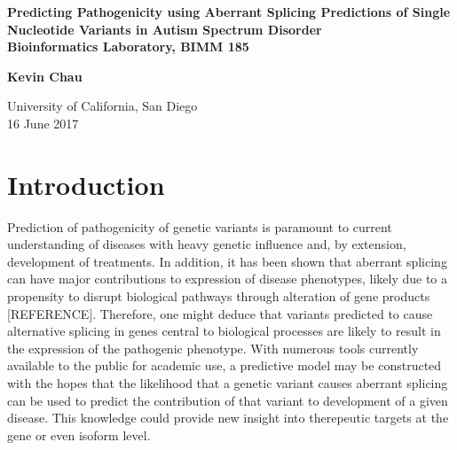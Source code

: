 \documentclass[12pt]{article}
\begin{document}
\lstset{style=output}
\setlength\parindent{0pt}

\begin{titlepage}
    \begin{center}
        \vspace*{1cm}

        \Huge
        \textbf{Predicting Pathogenicity using Aberrant Splicing Predictions of Single Nucleotide Variants in Autism Spectrum Disorder}\\


        \vspace{0.5cm}
        \Large
        \textbf{Bioinformatics Laboratory, BIMM 185}

        \vspace{1.5cm}
        \textbf{Kevin Chau}

        \vfill

        \Large
        University of California, San Diego\\
        16 June 2017
    \end{center}
\end{titlepage}


\pagebreak

\section{Introduction}
Prediction of pathogenicity of genetic variants is paramount to current 
understanding of diseases with heavy genetic influence and, by extension,
development of treatments. In addition, it has been shown that aberrant 
splicing can have major contributions to expression of disease phenotypes, 
likely due to a propensity to disrupt biological pathways through alteration 
of gene products [REFERENCE]. Therefore, one might deduce that variants 
predicted to cause alternative splicing in genes central to biological 
processes are likely to result in the expression of the pathogenic phenotype. 
With numerous tools currently available to the public for academic use, a 
predictive model may be constructed with the hopes that the likelihood that a 
genetic variant causes aberrant splicing can be used to predict the contribution 
of that variant to development of a given disease. This knowledge could provide 
new insight into therepeutic targets at the gene or even isoform level.
\end{document}
